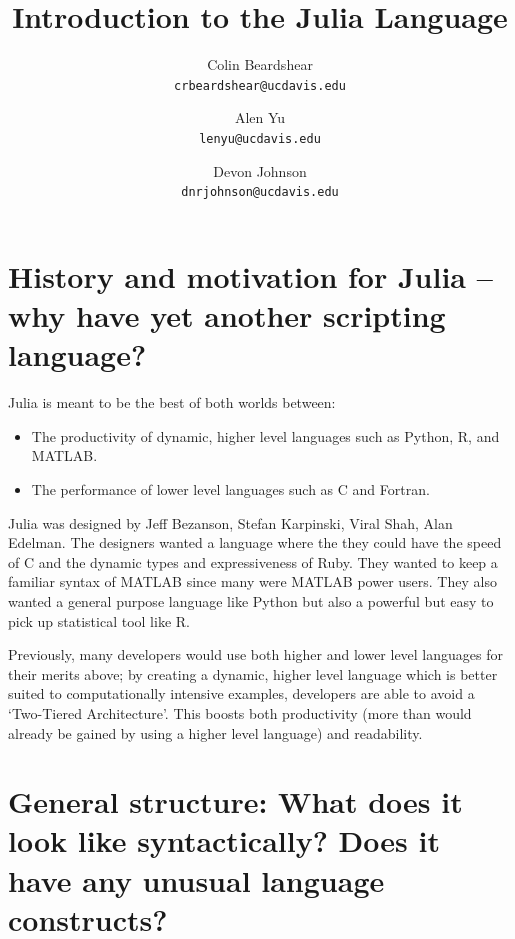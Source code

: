 \documentclass[10pt]{article}
\title{Introduction to the Julia Language}
\author{Colin Beardshear\\ \texttt{crbeardshear@ucdavis.edu} \and
Alen Yu\\ \texttt{lenyu@ucdavis.edu} \and
Devon Johnson\\ \texttt{dnrjohnson@ucdavis.edu}
}
\begin{document}
\maketitle


\section*{\normalsize History and motivation for Julia -- why have yet another scripting language?}

Julia is meant to be the best of both worlds between:
\begin{itemize}
\item The productivity of dynamic, higher level languages such as Python, R, and MATLAB.
\item The performance of lower level languages such as C and Fortran.
\end{itemize}
Julia was designed by Jeff Bezanson, Stefan Karpinski, Viral Shah, Alan Edelman. The designers wanted a language where the they could have the speed of C and the dynamic types and expressiveness of Ruby. They wanted to keep a familiar syntax of MATLAB since many were MATLAB power users. They also wanted a general purpose language like Python but also a powerful but easy to pick up statistical tool like R.

Previously, many developers would use both higher and lower level languages for their merits above; by creating a dynamic, higher level language which is better suited to computationally intensive examples, developers are able to avoid a `Two-Tiered Architecture'\cite{juliadevs}. This boosts both productivity (more than would already be gained by using a higher level language) and readability.

\section*{\normalsize General structure: What does it look like syntactically? Does it have any unusual language constructs?}
\end{document}
